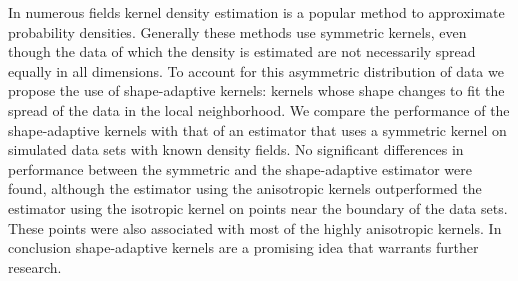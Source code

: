 \noindent In numerous fields kernel density estimation is a popular method to approximate probability densities.
Generally these methods use symmetric kernels, even though the data of which the density is estimated are not necessarily spread equally in all dimensions. To account for this asymmetric distribution of data we propose the use of shape-adaptive kernels: kernels whose shape changes to fit the spread of the data in the local neighborhood.
We compare the performance of the shape-adaptive kernels with that of an estimator that uses a symmetric kernel on simulated data sets with known density fields.
No significant differences in performance between the symmetric and the shape-adaptive estimator were found, although the estimator using the anisotropic kernels outperformed the estimator using the isotropic kernel on points near the boundary of the data sets. These points were also associated with most of the highly anisotropic kernels.
In conclusion shape-adaptive kernels are a promising idea that warrants further research.
